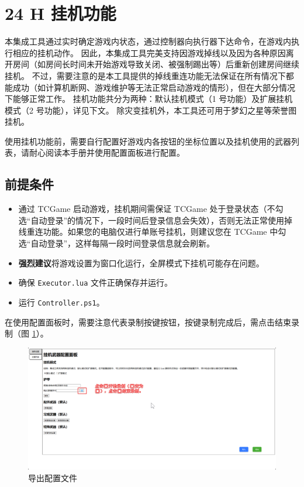 \section{24 H 挂机功能}

本集成工具通过实时确定游戏内状态，通过控制器向执行器下达命令，在游戏内执行相应的挂机动作。
因此，本集成工具完美支持因游戏掉线以及因为各种原因离开房间（如房间长时间未开始游戏导致关闭、被强制踢出等）后重新创建房间继续挂机。
不过，需要注意的是本工具提供的掉线重连功能无法保证在所有情况下都能成功（如计算机断网、游戏维护等无法正常启动游戏的情形），但在大部分情况下能够正常工作。
挂机功能共分为两种：默认挂机模式（1 号功能）及扩展挂机模式（2 号功能），详见下文。
除灾变挂机外，本工具还可用于梦幻之星等荣誉图挂机。

使用挂机功能前，需要自行配置好游戏内各按钮的坐标位置以及挂机使用的武器列表，请耐心阅读本手册并使用配置面板进行配置。

\subsection{前提条件}

\begin{itemize}

\item 通过 TCGame 启动游戏，挂机期间需保证 TCGame 处于登录状态（不勾选“自动登录”的情况下，一段时间后登录信息会失效），否则无法正常使用掉线重连功能。如果您的电脑仅进行单账号挂机，则建议您在 TCGame 中勾选“自动登录”，这样每隔一段时间登录信息就会刷新。

\item \textbf{\color{red}强烈建议}将游戏设置为窗口化运行，全屏模式下挂机可能存在问题。

\item 确保 \lstinline{Executor.lua} 文件正确保存并运行。

\item 运行 \lstinline{Controller.ps1}。

\end{itemize}

在使用配置面板时，需要注意️代表录制按键按钮，按键录制完成后，需点击结束录制（图 \ref{ch2fig-about-recording}）。

\begin{figure}[H]
    \Centering
    \includegraphics[width=\textwidth]{assets/about_recording}
    \caption{导出配置文件}
    \label{ch2fig-about-recording}
\end{figure}

